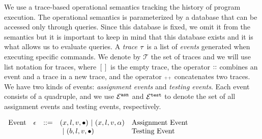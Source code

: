 We use a trace-based operational semantics tracking the history of program execution. The operational semantics is parameterized by a database that can be accessed only through queries. Since this database is fixed, we omit it from the semantics but it is important to keep in mind that this database exists and it is what allows us to evaluate queries.
A \emph{trace}
$\mathtt{\tau}$ is a list of \emph{events} generated when executing specific commands. We denote by $\mathcal{T}$ the set of traces and we will use list notation for traces,
 where $[]$ is the empty trace, the operator ${\small ::}$ combines an event and a trace in a new trace, 
and the operator ${\scriptscriptstyle ++}$ concatenates two traces. 
We have two kinds of events: \emph{assignment events} and \emph{testing events}. 
Each event consists of a quadruple,
and we use $\mathcal{E}^{\mathtt{{asn}}}$ and $\mathcal{E}^{\mathtt{{test}}}$ to denote the set of all assignment events and testing events, respectively.
\begin{center}
  $ \begin{array}{lllll}
  \mbox{Event} 
  & \mathtt{\epsilon} & ::= & 
  ({x}, l, v, \bullet) ~|~ ({x}, l, v, \alpha)  & \mbox{Assignment Event} \\
  &&& ~|~(b, l, v, \bullet)  & \mbox{Testing Event}
  \\
  \end{array}$
  \end{center}
